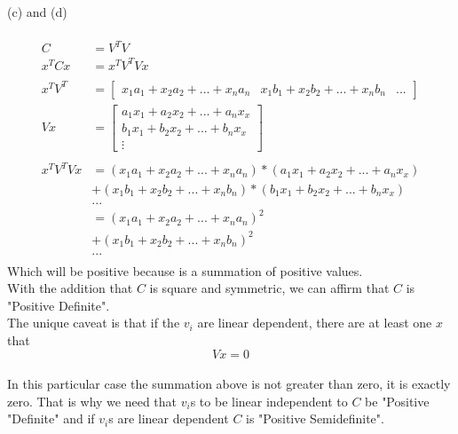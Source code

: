 \documentclass{article}
\begin{document}
	\\
	(c) and (d)\\
	\\
	\begin{align*}
		C&=V^TV\\
		x^TCx&=x^TV^TVx\\
		\\
		x^TV^T &= \begin{bmatrix}
		x_1a_1+x_2a_2+...+x_na_n&
		x_1b_1+x_2b_2+...+x_nb_n&
		...
		\end{bmatrix}\\
		Vx &= \begin{bmatrix}
		 a_1x_1+a_2x_2+...+a_nx_x\\		 
		 b_1x_1+b_2x_2+...+b_nx_x\\
		 \vdots
		\end{bmatrix}\\
		\\
		x^TV^TVx &= (x_1a_1+x_2a_2+...+x_na_n)*(a_1x_1+a_2x_2+...+a_nx_x)\\
			&+(x_1b_1+x_2b_2+...+x_nb_n)*(b_1x_1+b_2x_2+...+b_nx_x)\\
			&...\\
		 &= (x_1a_1+x_2a_2+...+x_na_n)^2\\
		&+(x_1b_1+x_2b_2+...+x_nb_n)^2\\
		&...\\
	\end{align*}
	Which will be positive because is a summation of positive values.\\
	With the addition that $C$ is square and symmetric, we can affirm that $C$ is "Positive Definite".\\
	The unique caveat is that if the $v_i$ are linear dependent, there are at least one $x$ that $$Vx=0$$\\
	In this particular case the summation above is not greater than zero, it is exactly zero. That is why we need that $v_i$s to be linear independent to $C$ be "Positive "Definite" and if $v_i$s are linear dependent $C$ is "Positive Semidefinite".\\
\end{document}
